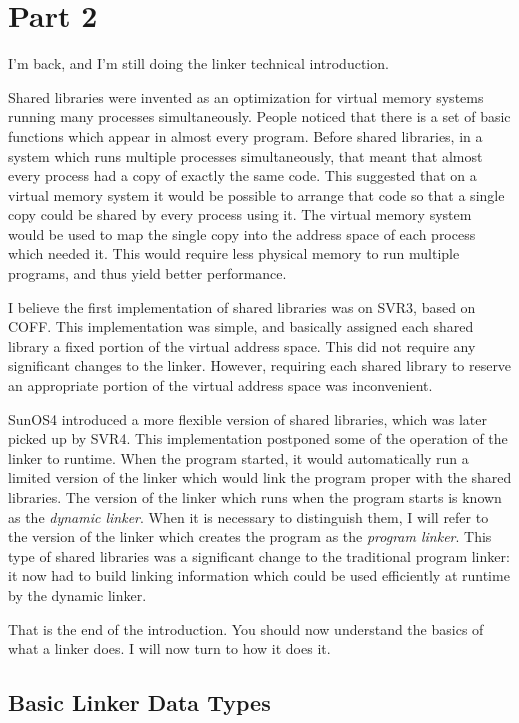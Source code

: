 \section{Part 2}

I'm back, and I'm still doing the linker technical introduction.

Shared libraries were invented as an optimization for virtual memory
systems running many processes simultaneously. People noticed that
there is a set of basic functions which appear in almost every program.
Before shared libraries, in a system which runs multiple processes
simultaneously, that meant that almost every process had a copy of
exactly the same code. This suggested that on a virtual memory system
it would be possible to arrange that code so that a single copy could
be shared by every process using it. The virtual memory system would
be used to map the single copy into the address space of each process
which needed it. This would require less physical memory to run multiple
programs, and thus yield better performance.

I believe the first implementation of shared libraries was on SVR3,
based on COFF\@. This implementation was simple, and basically assigned
each shared library a fixed portion of the virtual address space.
This did not require any significant changes to the linker. However,
requiring each shared library to reserve an appropriate portion of the
virtual address space was inconvenient.

SunOS4 introduced a more flexible version of shared libraries, which
was later picked up by SVR4. This implementation postponed some of
the operation of the linker to runtime. When the program started, it
would automatically run a limited version of the linker which would
link the program proper with the shared libraries. The version of the
linker which runs when the program starts is known as the \emph{dynamic
linker}. When it is necessary to distinguish them, I will refer to the
version of the linker which creates the program as the \emph{program
linker}. This type of shared libraries was a significant change to the
traditional program linker: it now had to build linking information
which could be used efficiently at runtime by the dynamic linker.

That is the end of the introduction. You should now understand the
basics of what a linker does. I will now turn to how it does it.

\subsection{Basic Linker Data Types}

